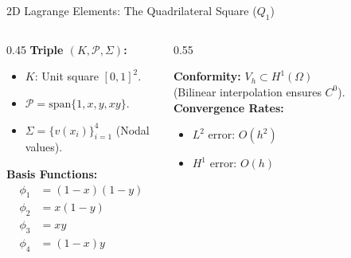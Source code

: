 \documentclass[aspectratio=169]{beamer}
\begin{document}
\begin{frame}{2D Lagrange Elements: The Quadrilateral Square ($Q_1$)}
    \begin{columns}
        \begin{column}{0.45\textwidth}
            \textbf{Triple $(K, \mathcal{P}, \Sigma)$:}
            \begin{itemize}
                \item $K$: Unit square $[0, 1]^2$.
                \item $\mathcal{P} = \text{span}\{1, x, y, xy\}$.
                \item $\Sigma = \{ v(x_i) \}_{i=1}^4$ (Nodal values).
            \end{itemize}
            \textbf{Basis Functions:}
            \begin{align*}
                \phi_1 &= (1-x)(1-y) \\
                \phi_2 &= x(1-y) \\
                \phi_3 &= xy \\
                \phi_4 &= (1-x)y
            \end{align*}
        \end{column}
        \begin{column}{0.55\textwidth}
            \begin{center}
            \end{center}
            \textbf{Conformity:} $V_h \subset H^1(\Omega)$ \\
            (Bilinear interpolation ensures $C^0$).
            \textbf{Convergence Rates:}
            \begin{itemize}
                \item $L^2$ error: $O(h^2)$
                \item $H^1$ error: $O(h)$
            \end{itemize}

        \end{column}
    \end{columns}
\end{frame}
\end{document}
